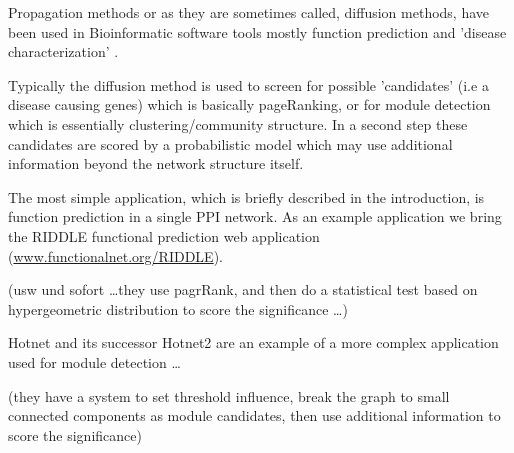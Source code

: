 \documentclass[a4paper,10pt]{article}
\theoremstyle{definition}
\theoremstyle{remark}
\theoremstyle{plain}
\begin{document}
Propagation methods or as they are sometimes called, diffusion methods, have
been used in Bioinformatic software tools mostly function prediction and
'disease characterization' \cite{cowen2017network}.

Typically the diffusion method is used to screen for possible 'candidates' (i.e
a disease causing genes) which is basically pageRanking, or for module detection
which is essentially clustering/community structure. In a second step these
candidates are scored by a probabilistic model which may use additional
information beyond the network structure itself.

The most simple application, which is briefly described in the introduction, is 
function prediction in a single PPI network. As an example application we bring
the RIDDLE \cite{wang2012riddle} functional prediction web application
(\url{www.functionalnet.org/RIDDLE}). 

(usw und sofort \dots they use pagrRank, and then do a statistical test based on
hypergeometric distribution to score the significance \dots) 




Hotnet \cite{vandin2012discovery} and its successor Hotnet2
\cite{leiserson2015pan} are an example of a more complex application
used for module detection \dots

(they have a system to set threshold influence, break the graph to small 
connected components as module candidates, then use additional information 
to score the significance)
\end{document}
